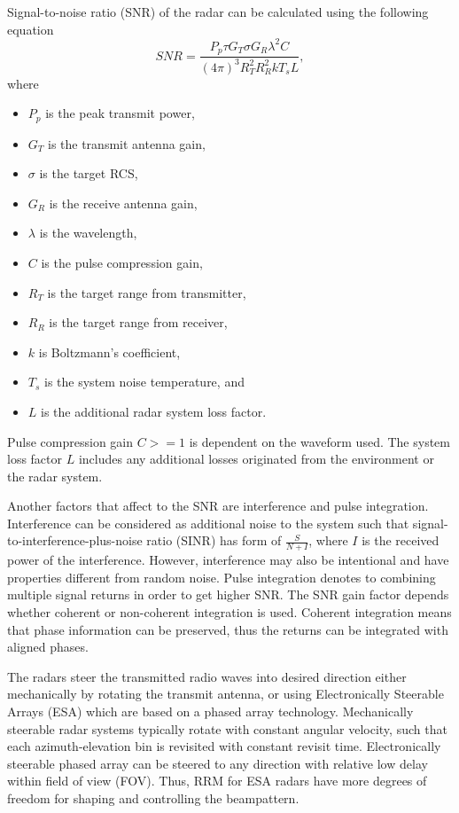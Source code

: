 \documentclass[english, 12pt, a4paper, elec, utf8, a-1b, online]{aaltothesis}
\begin{document}
Signal-to-noise ratio (SNR) of the radar can be calculated using the following equation \cite{Curry2011}
\begin{equation} \label{eq:radar_snr}
SNR = \frac{P_p \tau G_T \sigma G_R \lambda^2 C}{(4\pi)^3 R_T^2 R_R^2 k T_s L},
\end{equation}
where
\begin{itemize}
    \item $P_p$ is the peak transmit power,
    \item $G_T$ is the transmit antenna gain,
    \item $\sigma$ is the target RCS,
    \item $G_R$ is the receive antenna gain,
    \item $\lambda$ is the wavelength,
    \item $C$ is the pulse compression gain,
    \item $R_T$ is the target range from transmitter,
    \item $R_R$ is the target range from receiver,
    \item $k$ is Boltzmann's coefficient,
    \item $T_s$ is the system noise temperature, and 
    \item $L$ is the additional radar system loss factor.
\end{itemize}
Pulse compression gain $C >= 1$ is dependent on the waveform used.
The system loss factor $L$ includes any additional losses originated from the environment or the radar system.

Another factors that affect to the SNR are interference and pulse integration.
Interference can be considered as additional noise to the system such that signal-to-interference-plus-noise ratio (SINR) has form of $\frac{S}{N+I}$, where
$I$ is the received power of the interference.
However, interference may also be intentional and have properties  different from random noise. 
Pulse integration denotes to combining multiple signal returns in order to get higher SNR.
The SNR gain factor depends whether coherent or non-coherent integration is used.
Coherent integration means that phase information can be preserved, thus the returns can be integrated with aligned phases.

The radars steer the transmitted radio waves into desired direction either mechanically by rotating the transmit antenna, or using Electronically Steerable Arrays (ESA) which are based on a phased array technology.
Mechanically steerable radar systems typically rotate with constant angular velocity, such that each azimuth-elevation bin is revisited with constant revisit time.
Electronically steerable phased array can be steered to any direction with relative low delay within field of view (FOV).
Thus, RRM for ESA radars have more degrees of freedom for shaping and controlling the beampattern.
\end{document}
